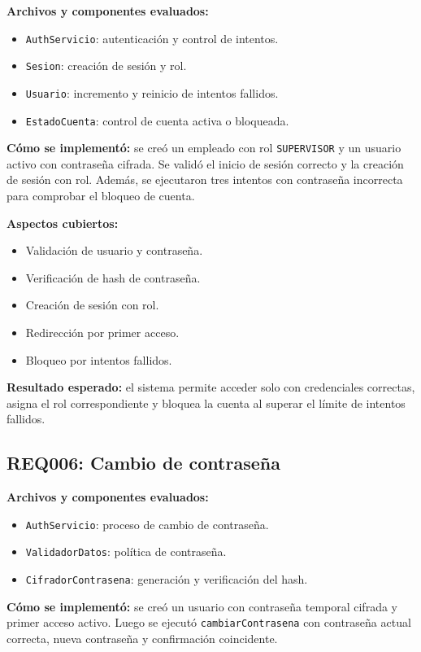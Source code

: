 \documentclass[12pt,a4paper]{article}
\begin{document}
\textbf{Archivos y componentes evaluados:}
\begin{itemize}[leftmargin=*]
    \item \texttt{AuthServicio}: autenticación y control de intentos.
    \item \texttt{Sesion}: creación de sesión y rol.
    \item \texttt{Usuario}: incremento y reinicio de intentos fallidos.
    \item \texttt{EstadoCuenta}: control de cuenta activa o bloqueada.
\end{itemize}

\textbf{Cómo se implementó:} se creó un empleado con rol \texttt{SUPERVISOR} y un usuario activo con contraseña cifrada. Se validó el inicio de sesión correcto y la creación de sesión con rol. Además, se ejecutaron tres intentos con contraseña incorrecta para comprobar el bloqueo de cuenta.

\textbf{Aspectos cubiertos:}
\begin{itemize}[leftmargin=*]
    \item Validación de usuario y contraseña.
    \item Verificación de hash de contraseña.
    \item Creación de sesión con rol.
    \item Redirección por primer acceso.
    \item Bloqueo por intentos fallidos.
\end{itemize}

\textbf{Resultado esperado:} el sistema permite acceder solo con credenciales correctas, asigna el rol correspondiente y bloquea la cuenta al superar el límite de intentos fallidos.

\subsection{REQ006: Cambio de contraseña}

\textbf{Archivos y componentes evaluados:}
\begin{itemize}[leftmargin=*]
    \item \texttt{AuthServicio}: proceso de cambio de contraseña.
    \item \texttt{ValidadorDatos}: política de contraseña.
    \item \texttt{CifradorContrasena}: generación y verificación del hash.
\end{itemize}

\textbf{Cómo se implementó:} se creó un usuario con contraseña temporal cifrada y primer acceso activo. Luego se ejecutó \texttt{cambiarContrasena} con contraseña actual correcta, nueva contraseña y confirmación coincidente.
\end{document}
